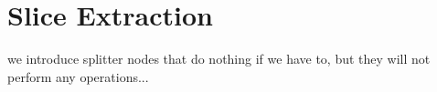 \section{Slice Extraction}
\label{sec:extract}
we introduce splitter nodes that do nothing if we have to, but they
will not perform any operations...
